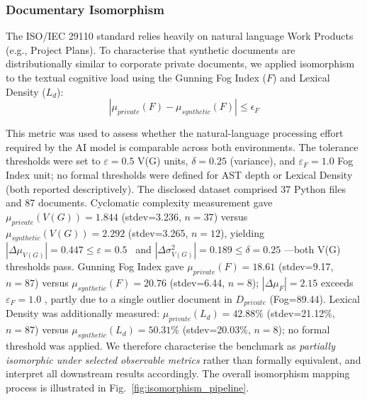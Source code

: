 \documentclass{ieeeaccess}
\begin{document}
\subsubsection{Documentary Isomorphism}

The ISO/IEC 29110 standard relies heavily on natural language Work Products (e.g., Project Plans). To characterise that synthetic documents are distributionally similar to corporate private documents, we applied isomorphism to the textual cognitive load using the Gunning Fog Index ($F$) and Lexical Density ($L_d$):
\begin{equation}
|\mu_{private}(F) - \mu_{synthetic}(F)| \leq \epsilon_F
\label{eq:fog_iso}
\end{equation}

This metric was used to assess whether the natural-language processing effort required by the AI model is comparable across both environments. The tolerance thresholds were set to $\varepsilon = 0.5$ V(G) units, $\delta = 0.25$ (variance), and $\varepsilon_F = 1.0$ Fog Index unit; no formal thresholds were defined for AST depth or Lexical Density (both reported descriptively). The disclosed dataset comprised 37 Python files and 87 documents. Cyclomatic complexity measurement gave $\mu_{private}(V(G))=1.844$ (stdev=3.236, $n=37$) versus $\mu_{synthetic}(V(G))=2.292$ (stdev=3.265, $n=12$), yielding $|\Delta\mu_{V(G)}| = 0.447 \leq \varepsilon = 0.5$ \checkmark\ and $|\Delta\sigma^2_{V(G)}| = 0.189 \leq \delta = 0.25$ \checkmark---both V(G) thresholds pass. Gunning Fog Index gave $\mu_{private}(F)=18.61$ (stdev=9.17, $n=87$) versus $\mu_{synthetic}(F)=20.76$ (stdev=6.44, $n=8$); $|\Delta\mu_F| = 2.15$ exceeds $\varepsilon_F = 1.0$ \texttimes, partly due to a single outlier document in $D_{private}$ (Fog=89.44). Lexical Density was additionally measured: $\mu_{private}(L_d)=42.88\%$ (stdev=21.12\%, $n=87$) versus $\mu_{synthetic}(L_d)=50.31\%$ (stdev=20.03\%, $n=8$); no formal threshold was applied. We therefore characterise the benchmark as \emph{partially isomorphic under selected observable metrics} rather than formally equivalent, and interpret all downstream results accordingly. The overall isomorphism mapping process is illustrated in Fig.~\ref{fig:isomorphism_pipeline}.
\end{document}

